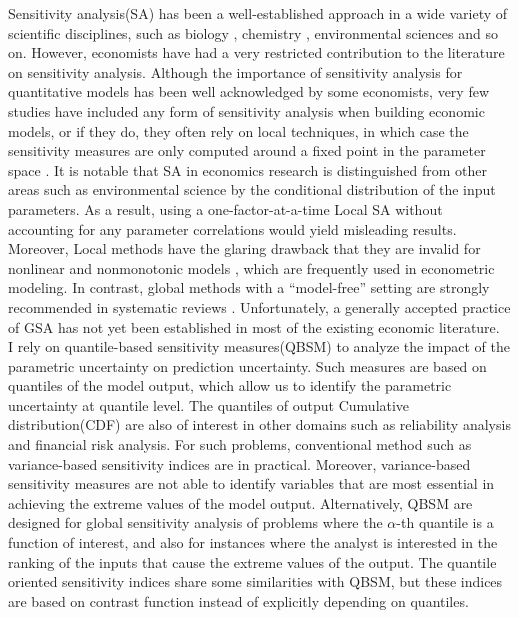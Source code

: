 \noindent
Sensitivity analysis(SA) has been a well-established approach in a wide variety of scientific disciplines, such as biology \citep{zi2011SensitivityAnalysisApproaches}, chemistry \citep{saltelli2005SensitivityAnalysisChemical}, environmental sciences \citep{campolongo1997SensitivityAnalysisEnvironmental} and so on. However, economists have had a very restricted contribution to the literature on sensitivity analysis. Although the importance of sensitivity analysis for quantitative models has been well acknowledged by some economists, very few studies have included any form of sensitivity analysis when building economic models, or if they do, they often rely on local techniques, in which case the sensitivity measures are only computed around a fixed point in the parameter space \citep{canova1994StatisticalInferenceCalibrated, harenberg2019UncertaintyQuantificationGlobal, leamer1985SensitivityAnalysesWould}. It is notable that SA in economics research is distinguished from other areas such as environmental science by the conditional distribution of the input parameters. As a result, using a one-factor-at-a-time Local SA without accounting for any parameter correlations would yield misleading results. Moreover, Local methods have the glaring drawback that they are invalid for nonlinear and nonmonotonic models \citep{saltelli2004SensitivityAnalysisPractice}, which are frequently used in econometric modeling. In contrast, global methods with a “model-free” setting are strongly recommended in systematic reviews \citep{saltelli2019WhyManyPublished}. Unfortunately, a generally accepted practice of GSA has not yet been established in most of the existing economic literature.\\

\noindent
I rely on quantile-based sensitivity measures(QBSM) \citep{kucherenko2019QuantileBasedGlobal} to analyze the impact of the parametric uncertainty on prediction uncertainty. Such measures are based on quantiles of the model output, which allow us to identify the parametric uncertainty at quantile level. The quantiles of output Cumulative distribution(CDF) are also of interest in other domains such as reliability analysis and financial risk analysis. For such problems, conventional method such as variance-based sensitivity indices \citep{sobol1993SensitivityEstimatesNonlinear} are in practical. Moreover, variance-based sensitivity measures are not able to identify variables that are most essential in achieving the extreme values of the model output. Alternatively, QBSM are designed for global sensitivity analysis of problems where the $\alpha$-th quantile is a function of interest, and also for instances where the analyst is interested in the ranking of the inputs that cause the extreme values of the output. The quantile oriented sensitivity indices \citep{kala2019QuantileorientedGlobalSensitivity} share some similarities with QBSM, but these indices are based on contrast function instead of explicitly depending on quantiles.\\

